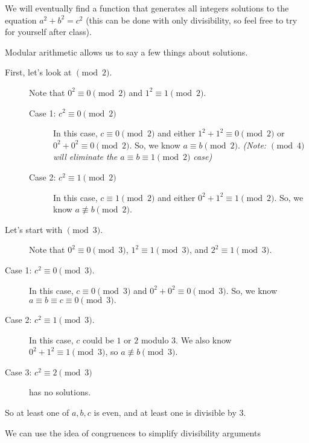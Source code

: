 \documentclass{../ximera}
\begin{document}
\begin{example}
 We will eventually find a function that generates all integers solutions to the equation $a^2+b^2=c^2$ (this can be done with only divisibility, so feel free to try for yourself after class).
 
 Modular arithmetic allows us to say a few things about solutions. 
 \begin{description}
 \item[First, let's look at $\!\pmod 2$.] Note that $0^2\equiv 0 \pmod 2$ and $1^2\equiv 1 \pmod 2$.

\begin{description}
 \item[Case 1: $c^2\equiv 0 \pmod 2$] In this case, $c\equiv 0\pmod 2$ and either $1^2+1^2\equiv 0\pmod 2$ or $0^2+0^2\equiv 0\pmod 2$. So, we know $a\equiv b\pmod 2.$ \emph{(Note: $\!\pmod 4$ will eliminate the $a\equiv b\equiv 1 \pmod 2$ case)}
  \item[Case 2: $c^2\equiv 1 \pmod 2$] In this case, $c\equiv 1\pmod 2$ and either $0^2+1^2\equiv 1\pmod 2$. So, we know $a\not\equiv b\pmod 2.$
\end{description}

\item[Let's start with $\!\pmod 3$.] Note that $0^2\equiv 0 \pmod 3$, $1^2\equiv 1 \pmod 3$, and $2^2\equiv 1 \pmod 3$.
\end{description} 

\begin{description}
 \item[Case 1: $c^2\equiv 0 \pmod 3$.] In this case, $c\equiv 0\pmod 3$ and $0^2+0^2\equiv 0\pmod 3$. So, we know $a\equiv b\equiv c\equiv 0\pmod 3.$ 
  \item[Case 2: $c^2\equiv 1 \pmod 3$.] In this case, $c$ could be $1$ or $2$ modulo $3$. We also know $0^2+1^2\equiv 1\pmod 3$, so  $a\not\equiv b\pmod 3.$
  \item[Case 3: $c^2\equiv 2 \pmod 3$] has no solutions.
\end{description}

So at least one of $a,b,c$ is even, and at least one is divisible by $3$.
\end{example}

We can use the idea of congruences to simplify divisibility arguments
\end{document}
